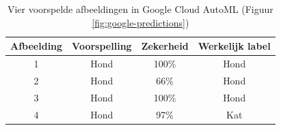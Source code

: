 \begin{table}[ht]
    \centering
    \begin{tabular}{c c c c} %
        \hline\hline %
        Afbeelding & Voorspelling & Zekerheid & Werkelijk label \\ [0.5ex] %
        \hline %
        1   &  Hond  & 100\%   & Hond \\ 
        \hline %
        2   &  Hond  & 66\%   & Hond \\ 
        \hline
        3   &  Hond  & 100\%   & Hond \\ 
        \hline
        4   &  Hond  & 97\%   & Kat \\ 
        \hline
    \end{tabular}
    \caption{Vier voorspelde afbeeldingen in Google Cloud AutoML (Figuur \ref{fig:google-predictions})}
    \label{table:google-predicted-images}
\end{table}

